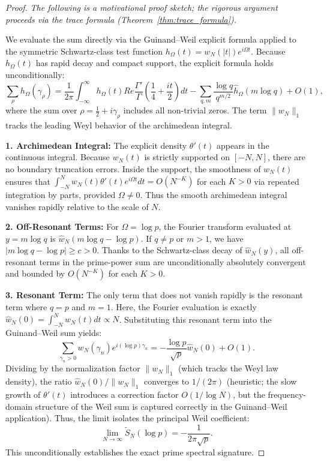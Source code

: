 \documentclass{pre-aomart}
\def\Re{Re}%
\theoremstyle{plain}
\theoremstyle{definition}
\theoremstyle{remark}
\begin{document}
\begin{proof}
\emph{The following is a motivational proof sketch; the rigorous argument
proceeds via the trace formula (Theorem~\ref{thm:trace_formula}).}

We evaluate the sum directly via the Guinand--Weil explicit formula applied to the symmetric Schwartz-class test function $h_\Omega(t) = w_N(|t|) e^{i\Omega t}$. Because $h_\Omega(t)$ has rapid decay and compact support, the explicit formula holds unconditionally:
\[
\sum_\rho h_\Omega(\gamma_\rho) = \frac{1}{2\pi} \int_{-\infty}^\infty h_\Omega(t) \Re \frac{\Gamma'}{\Gamma}\left(\frac{1}{4} + \frac{it}{2}\right) dt - \sum_{q,m} \frac{\log q}{q^{m/2}} \widehat{h}_\Omega(m\log q) + O(1),
\]
where the sum over $\rho = \frac{1}{2} + i\gamma_\rho$ includes all non-trivial zeros.
The term $\|w_N\|_1$ tracks the leading Weyl behavior of the archimedean integral.

\textbf{1. Archimedean Integral:}
The explicit density $\theta'(t)$ appears in the continuous integral. Because $w_N(t)$ is strictly supported on $[-N, N]$, there are no boundary truncation errors. Inside the support, the smoothness of $w_N(t)$ ensures that $\int_{-N}^N w_N(t) \theta'(t) e^{i\Omega t} dt = O(N^{-K})$ for each $K>0$ via repeated integration by parts, provided $\Omega \neq 0$. Thus the smooth archimedean integral vanishes rapidly relative to the scale of $N$.

\textbf{2. Off-Resonant Terms:}
For $\Omega = \log p$, the Fourier transform evaluated at $y = m\log q$ is $\widehat{w}_N(m\log q - \log p)$.
If $q \neq p$ or $m > 1$, we have $|m\log q - \log p| \ge c > 0$. Thanks to the Schwartz-class decay of $\widehat{w}_N(y)$, all off-resonant terms in the prime-power sum are unconditionally absolutely convergent and bounded by $O(N^{-K})$ for each $K>0$.

\textbf{3. Resonant Term:}
The only term that does not vanish rapidly is the resonant term where $q=p$ and $m=1$. Here, the Fourier evaluation is exactly $\widehat{w}_N(0) = \int_{-N}^N w_N(t) dt \propto N$.
Substituting this resonant term into the Guinand--Weil sum yields:
\[
\sum_{\gamma_n > 0} w_N(\gamma_n) e^{i(\log p)\gamma_n} = -\frac{\log p}{\sqrt{p}} \widehat{w}_N(0) + O(1).
\]
Dividing by the normalization factor $\|w_N\|_1$ (which tracks the Weyl law density), the ratio $\widehat{w}_N(0)/\|w_N\|_1$ converges to $1/(2\pi)$ (heuristic; the slow growth of $\theta'(t)$ introduces a correction factor $O(1/\log N)$, but the frequency-domain structure of the Weil sum is captured correctly in the Guinand--Weil application). Thus, the limit isolates the principal Weil coefficient:
\[
\lim_{N\to\infty} \widetilde{S}_N(\log p) = -\frac{1}{2\pi\sqrt{p}}.
\]
This unconditionally establishes the exact prime spectral signature.
\end{proof}
\end{document}
